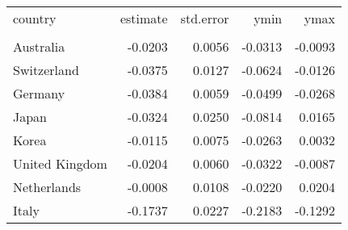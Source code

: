 \begin{tabular}{lrrrr}
   \toprule 
 
country & estimate & std.error & ymin & ymax \\ 

\cmidrule(lr){1-5} 
 
\\[-1.8ex]  
 
Australia & -0.0203 & 0.0056 & -0.0313 & -0.0093 \\ 
  Switzerland & -0.0375 & 0.0127 & -0.0624 & -0.0126 \\ 
  Germany & -0.0384 & 0.0059 & -0.0499 & -0.0268 \\ 
  Japan & -0.0324 & 0.0250 & -0.0814 & 0.0165 \\ 
  Korea & -0.0115 & 0.0075 & -0.0263 & 0.0032 \\ 
  United Kingdom & -0.0204 & 0.0060 & -0.0322 & -0.0087 \\ 
  Netherlands & -0.0008 & 0.0108 & -0.0220 & 0.0204 \\ 
  Italy & -0.1737 & 0.0227 & -0.2183 & -0.1292 \\ 
   \bottomrule  
\end{tabular}
